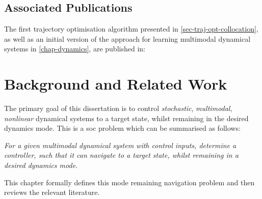 \documentclass{mimosis-class/mimosis}
\numberwithin{equation}{chapter}
\begin{document}
\section{Associated Publications}
\label{sec:org02f892f}
The first trajectory optimisation algorithm presented in \cref{sec-traj-opt-collocation}, as well as an initial
version of the approach for learning multimodal dynamical systems in \cref{chap-dynamics}, are published in:

{\color{BrickRed}}

\chapter{Background and Related Work}
\label{sec:org35433de}
\newcommand{\gpDomain}{\ensuremath{\mathcal{X}}}
\newcommand{\dynamicsModel}{\ensuremath{p_{\theta}}}
\newcommand{\constraintFunc}{\ensuremath{c}}
\newcommand{\safeSet}{\ensuremath{\mathcal{X}_{\text{feasible}}}}
The primary goal of this dissertation is to control \emph{stochastic}, \emph{multimodal}, \emph{nonlinear} dynamical systems
to a target state, whilst remaining in the desired dynamics mode.
This is a \acrfull{soc} problem which can be summarised as follows:
\begin{displayquote}
\textit{For a given multimodal dynamical system with control inputs, determine a controller, such that
it can navigate to a target state, whilst remaining in a desired dynamics mode.}
\end{displayquote}
This chapter formally defines this mode remaining navigation problem and then reviews the relevant literature.
\end{document}
